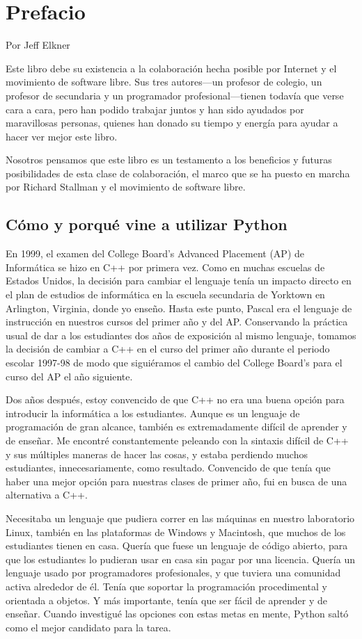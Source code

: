
\chapter{Prefacio}

Por Jeff Elkner

Este libro debe su existencia a la colaboración hecha posible por
Internet y el movimiento de software libre. Sus tres autores—un profesor
de colegio, un profesor de secundaria y un programador profesional—tienen
todavía que verse cara a cara, pero han podido trabajar juntos y han
sido ayudados por maravillosas personas, quienes han donado su tiempo
y energía para ayudar a hacer ver mejor este libro.

Nosotros pensamos que este libro es un testamento a los beneficios
y futuras posibilidades de esta clase de colaboración, el marco que
se ha puesto en marcha por Richard Stallman y el movimiento de software
libre.

\section*{Cómo y porqué vine a utilizar Python}

En 1999, el examen del College Board's Advanced Placement (AP) de
Informática se hizo en C++ por primera vez. Como en muchas escuelas
de Estados Unidos, la decisión para cambiar el lenguaje tenía un impacto
directo en el plan de estudios de informática en la escuela secundaria
de Yorktown en Arlington, Virginia, donde yo enseño. Hasta este punto,
Pascal era el lenguaje de instrucción en nuestros cursos del primer
año y del AP. Conservando la práctica usual de dar a los estudiantes
dos años de exposición al mismo lenguaje, tomamos la decisión de cambiar
a C++ en el curso del primer año durante el periodo escolar 1997-98
de modo que siguiéramos el cambio del College Board's para el curso
del AP el año siguiente.

Dos años después, estoy convencido de que C++ no era una buena opción
para introducir la informática a los estudiantes. Aunque es un lenguaje
de programación de gran alcance, también es extremadamente difícil
de aprender y de enseñar. Me encontré constantemente peleando con
la sintaxis difícil de C++ y sus múltiples maneras de hacer las cosas,
y estaba perdiendo muchos estudiantes, innecesariamente, como resultado.
Convencido de que tenía que haber una mejor opción para nuestras clases
de primer año, fui en busca de una alternativa a C++.

Necesitaba un lenguaje que pudiera correr en las máquinas en nuestro
laboratorio Linux, también en las plataformas de Windows y Macintosh,
que muchos de los estudiantes tienen en casa. Quería que fuese un
lenguaje de código abierto, para que los estudiantes lo pudieran usar
en casa sin pagar por una licencia. Quería un lenguaje usado por programadores
profesionales, y que tuviera una comunidad activa alrededor de él.
Tenía que soportar la programación procedimental y orientada a objetos.
Y más importante, tenía que ser fácil de aprender y de enseñar. Cuando
investigué las opciones con estas metas en mente, Python saltó como
el mejor candidato para la tarea.

